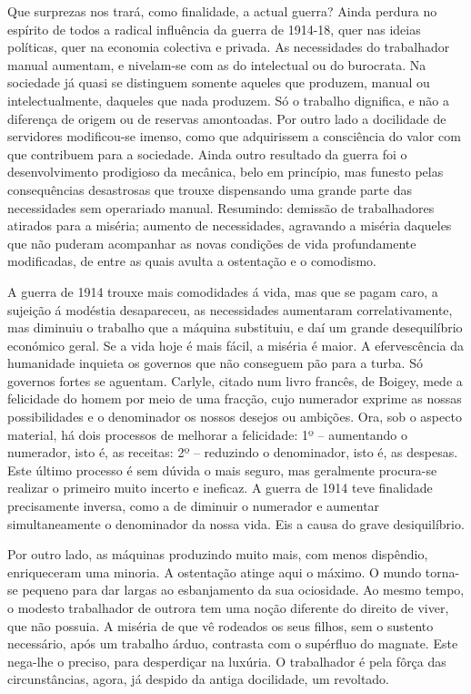 \documentclass[9pt]{article}
\begin{document}
Que surprezas nos trará, como finalidade, a actual guerra? Ainda perdura no espírito de todos a radical influência da guerra de \mbox{1914-18}, quer nas
ideias políticas, quer na economia colectiva e privada. As necessidades do
traba\-lhador manual aumentam, e nivelam-se com as do intelectual ou do burocrata. Na sociedade já quasi se distinguem somente aqueles que produzem,
manual ou intelectualmente, daqueles que nada produzem. Só o traba\-lho dignifi\-ca, e não a diferença de origem ou de reservas amontoadas. Por outro lado
a docilidade de servidores modificou-se imenso, como que adquirissem a consciência do valor com que contribuem para a sociedade. Ainda outro resultado
da guerra foi o desenvolvimento prodigioso da me\-câ\-ni\-ca, belo em princípio,
mas funesto pelas consequências desastrosas que trouxe dispensando uma gran\-de parte das necessidades sem operariado manual. Resumindo: demissão de traba\-lhadores atirados para a miséria; aumento de necessidades, agravando a miséria daqueles que não puderam acompanhar as novas condi\-ções de vida profundamente modifi\-cadas, de entre as quais avulta a ostenta\-ção e o comodismo.

A guerra de 1914 trouxe mais comodidades á vida, mas que se pagam caro, a sujei\-ção á modéstia desapareceu, as necessidades aumentaram correlativamente,
mas diminuiu o traba\-lho que a máquina substituiu, e daí um gran\-de desequilíbrio económico geral. Se a vida hoje é mais fácil, a miséria é maior. A efervescência da humanidade inquieta os governos que não conseguem pão para
a turba. Só governos fortes se aguentam.
Carlyle, citado num livro francês, de
Boigey, mede a felicidade do homem
por meio de uma frac\-ção, cujo numerador exprime as nossas possibilidades
e o denominador os nossos desejos ou
ambi\-ções. Ora, sob o aspecto material,
há dois processos de me\-lhorar a felicidade: 1º -- aumentando o numerador,
isto é, as receitas: 2º -- reduzindo o
denominador, isto é, as despesas. Este
último processo é sem dúvida o mais
seguro, mas geralmente procura-se realizar o primeiro muito incerto e inefi\-caz. A guerra de 1914 teve finalidade precisamente inversa, como a de
diminuir o numerador e aumentar simultaneamente o denominador da nossa
vida. Eis a causa do grave desiquilíbrio.

Por outro lado, as máquinas produzindo muito mais, com menos dispêndio,
enrique\-ceram uma minoria. A ostenta\-ção atinge aqui o má\-ximo. O mundo torna-se pequeno para dar largas ao esbanjamento da sua ociosidade. Ao mesmo
tempo, o modesto traba\-lhador de outrora tem uma no\-ção diferente do direito
de viver, que não possuia. A miséria de que vê rodeados os seus fi\-lhos, sem
o sustento necessário, após um traba\-lho árduo, contrasta com o supérfluo do
magnate. Este nega-\-lhe o preciso, para des\-per\-di\-çar na luxúria. O traba\-lhador
é pela fôrça das circunstâncias, agora, já despido da antiga docilidade, um
revoltado.
\end{document}
